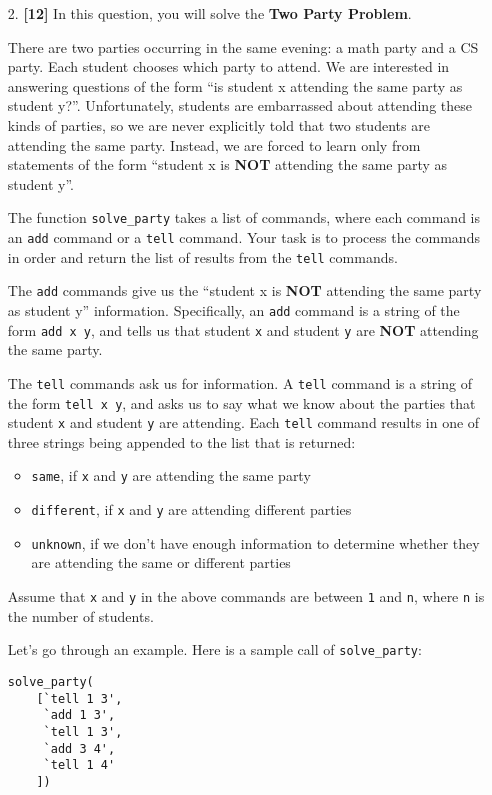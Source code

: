 \documentclass{assignment-263}
\begin{document}
\begin{enumerate}
	\newpage
	
	\item[2.] \textbf{[12]}
In this question, you will solve the {\bf Two Party Problem}.

There are two parties occurring in the same evening: a math party and a CS party.
Each student chooses which party to attend. We are interested in answering questions of the form ``is student x attending the same party as student y?''. Unfortunately, students are embarrassed about attending these kinds of parties, so we are never explicitly told that two students are attending the same party. Instead, we are forced to learn only from statements of the form 
``student x is {\bf NOT} attending the same party as student y''.

The function \verb|solve_party| takes a list of commands, where each command is an \verb|add| command or a \verb|tell| command. Your task is to process the commands in order and return the list of results from the \verb|tell| commands.

The \verb|add| commands give us the ``student x is {\bf NOT} attending the same party as student y'' information. Specifically, an \verb|add| command is a string of the form \verb|add x y|, and tells us that student \verb|x| and student \verb|y| are {\bf NOT} attending the same party.

The \verb|tell| commands ask us for information. A \verb|tell| command is a string of the form \verb|tell x y|, and asks us to say what we know about the parties that student \verb|x| and student \verb|y| are attending. Each \verb|tell| command results in one of three strings being appended to the list that is returned:
\begin{itemize}
\item \verb|same|, if \verb|x| and \verb|y| are attending the same party
\item \verb|different|, if \verb|x| and \verb|y| are attending different parties
\item \verb|unknown|, if we don't have enough information to determine whether they are attending the same or different parties
\end{itemize}

Assume that \verb|x| and \verb|y| in the above commands are between \verb|1| and \verb|n|, where \verb|n| is the number of students.

Let's go through an example. Here is a sample call of \verb|solve_party|:

\begin{verbatim}
solve_party(
    [`tell 1 3',
     `add 1 3',
     `tell 1 3',
     `add 3 4',
     `tell 1 4'
    ])
\end{verbatim}


\end{enumerate}
\end{document}
